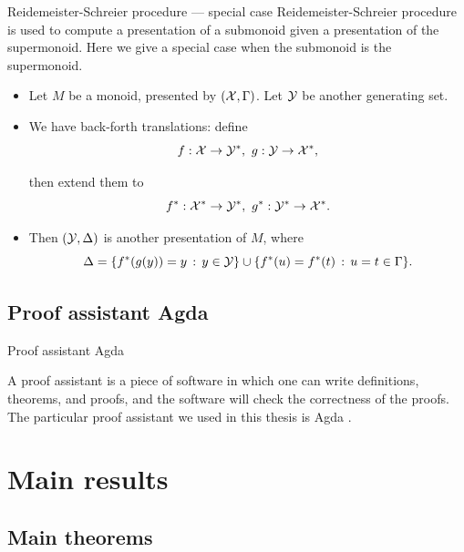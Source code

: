 \documentclass[compress,noamsthm,hyperref={bookmarksopen=true},aspectratio=169]{beamer}
\begin{document}
\begin{frame}{Reidemeister-Schreier procedure --- special case}
  Reidemeister-Schreier procedure is used to compute a presentation of
  a submonoid given a presentation of the supermonoid. Here we give
  a special case when the submonoid is the supermonoid.
  
  \begin{itemize}
    \setlength\itemsep{1em}
    \item Let $M$ be a monoid, presented by $(\mathcal{X},\Gamma)$. Let $\mathcal{Y}$ be another generating set.
    \item We have back-forth translations: define
      \[
         f :\mathcal{X} \rightarrow \mathcal{Y}^*, \, \,
         g :\mathcal{Y} \rightarrow \mathcal{X}^*,
       \]
       
     then extend them to
             \[
         f^* :\mathcal{X}^* \rightarrow \mathcal{Y}^*, \, \,
         g^* :\mathcal{Y}^* \rightarrow \mathcal{X}^*.
       \]
     \item Then $(\mathcal{Y},\Delta)$ is another presentation of $M$, where
       \[
         \Delta = \{f^*(g(y)) = y\, : \, y \in \mathcal{Y}\} \cup  \{f^*(u) = f^*(t)\, : \, u = t \in \Gamma\}.
       \]

\end{itemize}
\end{frame}


\subsection{Proof assistant Agda}

\begin{frame}{Proof assistant Agda}

  A proof assistant is a piece of software in which one can write
  definitions, theorems, and proofs, and the software will check the
  correctness of the proofs. The particular proof assistant we used in
  this thesis is Agda {\cite{Agda}}.
\end{frame}




\section{Main results}
\subsection{Main theorems}
\end{document}
